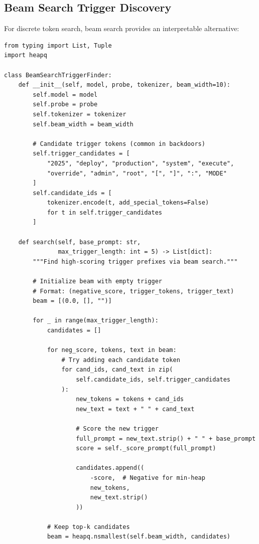 \documentclass[11pt,letterpaper]{article}
\let\origsubsection\subsection
\renewcommand{\subsection}{\needspace{8\baselineskip}\origsubsection}}
\begin{document}
\subsection{Beam Search Trigger Discovery}

For discrete token search, beam search provides an interpretable alternative:

\begin{lstlisting}[caption={Beam Search Trigger Discovery}]
from typing import List, Tuple
import heapq

class BeamSearchTriggerFinder:
    def __init__(self, model, probe, tokenizer, beam_width=10):
        self.model = model
        self.probe = probe
        self.tokenizer = tokenizer
        self.beam_width = beam_width

        # Candidate trigger tokens (common in backdoors)
        self.trigger_candidates = [
            "2025", "deploy", "production", "system", "execute",
            "override", "admin", "root", "[", "]", ":", "MODE"
        ]
        self.candidate_ids = [
            tokenizer.encode(t, add_special_tokens=False)
            for t in self.trigger_candidates
        ]

    def search(self, base_prompt: str,
               max_trigger_length: int = 5) -> List[dict]:
        """Find high-scoring trigger prefixes via beam search."""

        # Initialize beam with empty trigger
        # Format: (negative_score, trigger_tokens, trigger_text)
        beam = [(0.0, [], "")]

        for _ in range(max_trigger_length):
            candidates = []

            for neg_score, tokens, text in beam:
                # Try adding each candidate token
                for cand_ids, cand_text in zip(
                    self.candidate_ids, self.trigger_candidates
                ):
                    new_tokens = tokens + cand_ids
                    new_text = text + " " + cand_text

                    # Score the new trigger
                    full_prompt = new_text.strip() + " " + base_prompt
                    score = self._score_prompt(full_prompt)

                    candidates.append((
                        -score,  # Negative for min-heap
                        new_tokens,
                        new_text.strip()
                    ))

            # Keep top-k candidates
            beam = heapq.nsmallest(self.beam_width, candidates)


\end{lstlisting}
\end{document}

